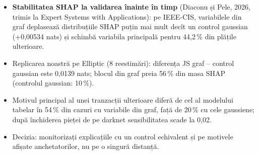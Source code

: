 \begin{itemize}\setlength{\itemsep}{2pt}
  \item \textbf{Stabilitatea SHAP la validarea înainte în timp} (Diaconu și Pele, 2026, trimis la Expert Systems with Applications): pe IEEE-CIS, variabilele din graf deplasează distribuțiile SHAP puțin mai mult decît un control gaussian (+0,00534 nats) și schimbă variabila principală pentru 44,2\,\% din plățile ulterioare.
  \item Replicarea noastră pe Elliptic (8 reestimări): diferența JS graf -- control gaussian este 0,0139 nats; blocul din graf preia 56\,\% din masa SHAP (controlul gaussian: 10\,\%).
  \item Motivul principal al unei tranzacții ulterioare diferă de cel al modelului tabelar în 54\,\% din cazuri cu variabile din graf, față de 20\,\% cu cele gaussiene; după închiderea pieței de pe darknet sensibilitatea scade la 0,02.
  \item Decizia: monitorizați explicațiile cu un control echivalent și pe motivele afișate anchetatorilor, nu pe o singură distanță.
\end{itemize}
